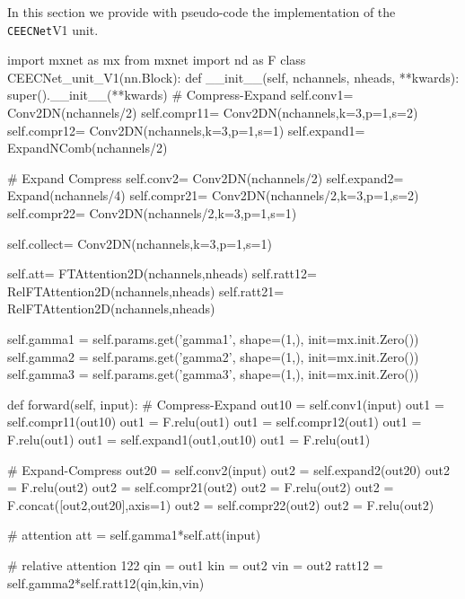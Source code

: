 \documentclass[times, 5p]{elsarticle}
\newcommand{\ceecnet}{\texttt{CEECNet}}
\begin{document}
In this section we provide with pseudo-code the implementation of the \ceecnet V1 unit. 
\begin{python}[caption={\textsc{mxnet/gluon} style pseudocode for the \ceecnet V1 unit.},
emph={CEECNet_unit_V1,forward,__init__},emphstyle=\textcolor{magenta},label={CEECNetUnitCODE}]
import mxnet as mx
from mxnet import nd as F
class CEECNet_unit_V1(nn.Block):
    def __init__(self, nchannels, nheads, **kwards):
        super().__init__(**kwards)
        # Compress-Expand
        self.conv1= Conv2DN(nchannels/2)
        self.compr11= Conv2DN(nchannels,k=3,p=1,s=2)
        self.compr12= Conv2DN(nchannels,k=3,p=1,s=1)
        self.expand1= ExpandNComb(nchannels/2)
        
        # Expand Compress
        self.conv2= Conv2DN(nchannels/2)
        self.expand2= Expand(nchannels/4)
        self.compr21= Conv2DN(nchannels/2,k=3,p=1,s=2)
        self.compr22= Conv2DN(nchannels/2,k=3,p=1,s=1)
        
        self.collect= Conv2DN(nchannels,k=3,p=1,s=1)
        
        self.att= FTAttention2D(nchannels,nheads)
        self.ratt12= RelFTAttention2D(nchannels,nheads)
        self.ratt21= RelFTAttention2D(nchannels,nheads)


        self.gamma1  = self.params.get('gamma1',
                      shape=(1,),
                      init=mx.init.Zero())
        self.gamma2  = self.params.get('gamma2',
                      shape=(1,),
                      init=mx.init.Zero())
        self.gamma3  = self.params.get('gamma3',
                      shape=(1,),
                      init=mx.init.Zero())

    def forward(self, input):
        # Compress-Expand
    	out10 = self.conv1(input)
    	out1  = self.compr11(out10)
    	out1  = F.relu(out1)
    	out1  = self.compr12(out1)
    	out1  = F.relu(out1)
    	out1  = self.expand1(out1,out10)
    	out1  = F.relu(out1)
    
    	# Expand-Compress  
    	out20 = self.conv2(input)
    	out2  = self.expand2(out20)
    	out2  = F.relu(out2)
    	out2  = self.compr21(out2)
    	out2  = F.relu(out2)
    	out2  = F.concat([out2,out20],axis=1)
    	out2  = self.compr22(out2)    	
    	out2  = F.relu(out2)

        # attention    
    	att   = self.gamma1*self.att(input)
    	
    	# relative attention 122
    	qin   = out1
        kin   = out2
        vin   = out2
        ratt12 = self.gamma2*self.ratt12(qin,kin,vin)


\end{python}
\end{document}
